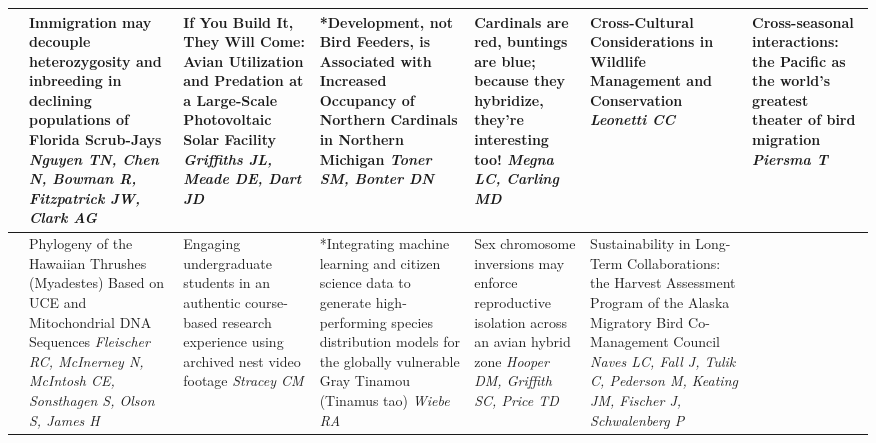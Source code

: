 \begin{tabular}{|x{0.75cm}|x{2.25cm}|x{2.25cm}|a{2.25cm}|a{2.25cm}|a{2.25cm}|a{2.25cm}|}
&Immigration may decouple heterozygosity and inbreeding in declining populations of Florida Scrub-Jays \newline \newline \textit{Nguyen TN, Chen N, Bowman R, Fitzpatrick JW, Clark AG} & If You Build It, They Will Come: Avian Utilization and Predation at a Large-Scale Photovoltaic Solar Facility \newline \newline \textit{Griffiths JL, Meade DE, Dart JD} & *Development, not Bird Feeders, is Associated with Increased Occupancy of Northern Cardinals in Northern Michigan \newline \newline \textit{Toner SM, Bonter DN} & Cardinals are red, buntings are blue; because they hybridize, they’re interesting too! \newline \newline \textit{Megna LC, Carling MD} & Cross-Cultural Considerations in Wildlife Management and Conservation \newline \newline \textit{Leonetti CC} & Cross-seasonal interactions: the Pacific as the world’s greatest theater of bird migration \newline \newline \textit{Piersma T}\\
\hline
{}&Phylogeny of the Hawaiian Thrushes (Myadestes) Based on UCE and Mitochondrial DNA Sequences \newline \newline \textit{Fleischer RC, McInerney N, McIntosh CE, Sonsthagen S, Olson S, James H} & Engaging undergraduate students in an authentic course-based research experience using archived nest video footage \newline \newline \textit{Stracey CM} & *Integrating machine learning and citizen science data to generate high-performing species distribution models for the globally vulnerable Gray Tinamou (Tinamus tao) \newline \newline \textit{Wiebe RA} & Sex chromosome inversions may enforce reproductive isolation across an avian hybrid zone \newline \newline \textit{Hooper DM, Griffith SC, Price TD} & Sustainability in Long-Term Collaborations: the Harvest Assessment Program of the Alaska Migratory Bird Co-Management Council \newline \newline \textit{Naves LC, Fall J, Tulik C, Pederson M, Keating JM, Fischer J, Schwalenberg P} &  \newline \newline \textit{}\\

\end{tabular}
